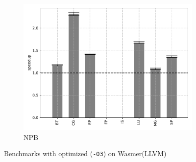 \begin{figure}
\begin{subfigure}[t]{.45\textwidth}
        \includegraphics[width=\textwidth]
        {Images/6.1.RQ1/npb-wasmer-llvm-opt.pdf}
        \caption{NPB}
    \end{subfigure}
    \caption{Benchmarks with optimized (\texttt{-O3}) on Wasmer(LLVM)}
    \label{fig:rq1-wasmer-llvm-opt}
\end{figure}

